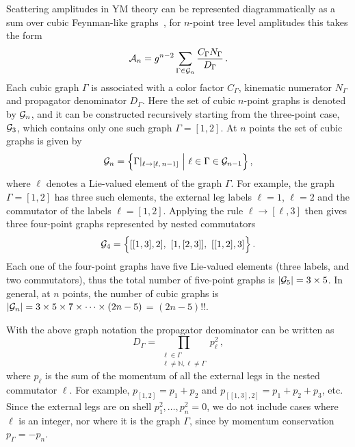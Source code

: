 \documentclass[11pt,a4paper]{article}
\begin{document}
Scattering amplitudes in YM theory can be represented diagrammatically as a sum over cubic Feynman-like graphs~\cite{Bern:2008qj,Bern:2010ue}, for $n$-point tree level amplitudes this takes the form
\begin{equation}
\label{NumAmplFormula}
\mathcal{A}_n= g^{n-2}\sum_{\Gamma\in{\cal G}_{n}}\frac{C_\Gamma N_\Gamma}{D_\Gamma} \, .
\end{equation}
Each cubic graph  $\Gamma$ is associated with a color factor $C_\Gamma$, kinematic numerator $N_\Gamma$ and propagator denominator $D_\Gamma$. 
Here the set of cubic $n$-point graphs is denoted by ${\cal{G}}_n$, and it can be constructed recursively starting from the three-point case, ${\cal{G}}_3$, which contains only one such graph $\Gamma=[1,2]$. At $n$ points the set of cubic graphs is given by
\begin{equation}
{\cal G}_n = \Big\{\Gamma|_{\ell \rightarrow [\ell,\, n-1]} ~\Big|~ \ell \in \Gamma \in  {\cal G}_{n-1} \Big\}\,,
\end{equation}
where $\ell$ denotes a Lie-valued element of the graph $\Gamma$. For example, the graph $\Gamma=[1,2]$ has three such elements, the external leg labels $\ell=1$, $\ell=2$ and the commutator of the labels $\ell=[1,2]$. Applying the rule $\ell \rightarrow [\ell,3]$ then gives three four-point graphs represented by nested commutators~\cite{Mafra:2020qst,Frost:2020eoa, Chen:2021chy}
\begin{equation}
{\cal G}_4 = \Big\{ [[1,3],2],~  [1,[2,3]],~  [[1,2],3] \Big\}\,.
\end{equation}
Each one of the four-point graphs have five Lie-valued elements (three labels, and two commutators), thus the total number of five-point graphs is $|{\cal G}_5|= 3\times 5$. In general, at $n$ points, the number of cubic graphs is  $|{\cal G}_n|= 3\times 5 \times 7 \times \cdots \times (2n-5)$ = $(2n-5)!!$.   

With the above graph notation the propagator denominator can be written as 
\begin{equation} \label{prop_denominator}
D_{\Gamma}=\!\!\!\!\prod_{\substack{\ell \in  \Gamma \\ \ell\neq \mathbb{N}, \ell\neq\Gamma}} \!\! p_\ell^2\,,
\end{equation}
where $p_\ell$ is the sum of the momentum of all the external legs in the nested commutator $\ell$. For example, $p_{[1,2]}=p_1+p_2$ and  $p_{[[1,3],2]}=p_1+p_2+p_3$, etc. Since the external legs are on shell $p_1^2,\ldots, p_n^2=0$, we do not include cases where $\ell$ is an integer, nor where it is the graph $\Gamma$, since by momentum conservation $p_\Gamma= -p_n$.
\end{document}
